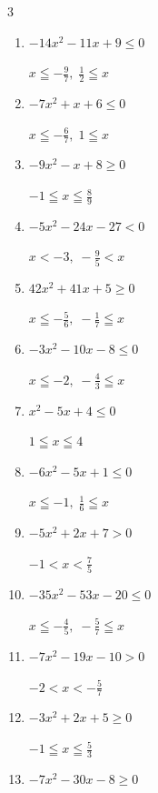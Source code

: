 \begin{multicols}{3}
\begin{enumerate}
  \item $-14x^{2}-11x+9\leq 0$

        $\displaystyle x \leqq -\frac{9}{7} , \; \frac{1}{2} \leqq x$

  \item $-7x^{2}+x+6\leq 0$

        $\displaystyle x \leqq -\frac{6}{7} , \; 1 \leqq x$

  \item $-9x^{2}-x+8\geq 0$

        $\displaystyle -1 \leqq x \leqq \frac{8}{9}$

\columnbreak %

  \item $-5x^{2}-24x-27<0$

        $\displaystyle x < -3 , \; -\frac{9}{5} < x$

  \item $42x^{2}+41x+5\geq 0$

        $\displaystyle x \leqq -\frac{5}{6} , \; -\frac{1}{7} \leqq x$

  \item $-3x^{2}-10x-8\leq 0$

        $\displaystyle x \leqq -2 , \; -\frac{4}{3} \leqq x$

  \item $x^{2}-5x+4\leq 0$

        $\displaystyle 1 \leqq x \leqq 4$

  \item $-6x^{2}-5x+1\leq 0$

        $\displaystyle x \leqq -1 , \; \frac{1}{6} \leqq x$

  \item $-5x^{2}+2x+7>0$

        $\displaystyle -1 < x < \frac{7}{5}$

  \item $-35x^{2}-53x-20\leq 0$

        $\displaystyle x \leqq -\frac{4}{5} , \; -\frac{5}{7} \leqq x$

  \item $-7x^{2}-19x-10>0$

        $\displaystyle -2 < x < -\frac{5}{7}$

  \item $-3x^{2}+2x+5\geq 0$

        $\displaystyle -1 \leqq x \leqq \frac{5}{3}$

  \item $-7x^{2}-30x-8\geq 0$


\end{enumerate}
\end{multicols}
